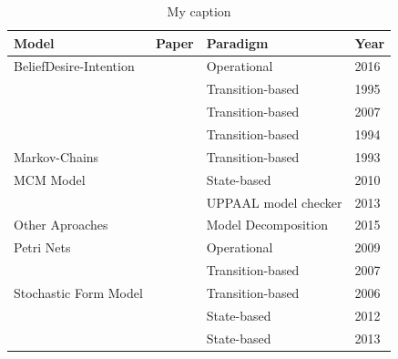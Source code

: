 \documentclass{report}
\begin{document}
\begin{table}[!h]
\centering
\caption{My caption}
\label{my-label}
\begin{tabular}{|l|l|l|l|}
\hline
\rowcolor[HTML]{C0C0C0} 
\textbf{Model}                          & \textbf{Paper}          & \textbf{Paradigm}    & \textbf{Year} \\ \hline
BeliefDesire-Intention                  & \cite{Araiza-Illan2016} & Operational          & 2016          \\ \hline
                                        & \cite{Avritzer1995b}    & Transition-based     & 1995          \\ \cline{2-4} 
                                        & \cite{Barros2007}       & Transition-based     & 2007          \\ \cline{2-4} 
                                        & \cite{Avritzer1994}     & Transition-based     & 1994          \\ \cline{2-4} 
\multirow{-4}{*}{Markov-Chains}         & \cite{Avritzer1993}     & Transition-based     & 1993          \\ \hline
MCM Model                               & \cite{Wieczorek2010}    & State-based          & 2010          \\ \hline
                                        & \cite{Enoiu2013}        & UPPAAL model checker & 2013          \\ \cline{2-4} 
\multirow{-2}{*}{Other Aproaches}       & \cite{Arcaini2015}      & Model Decomposition  & 2015          \\ \hline
Petri Nets                              & \cite{Buchs2009}        & Operational          & 2009          \\ \hline
                                        & \cite{Cai2007}          & Transition-based     & 2007          \\ \cline{2-4} 
\multirow{-2}{*}{Stochastic Form Model} & \cite{Draheim2006b}     & Transition-based     & 2006          \\ \hline
                                        & \cite{Fang2012}         & State-based          & 2012          \\ \cline{2-4} 
                                        & \cite{Sridhar2013}      & State-based          & 2013          \\ \cline{2-4} 

\end{tabular}
\end{table}
\end{document}
